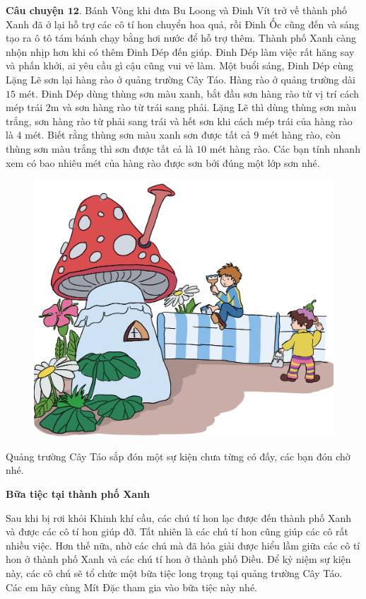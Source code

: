 	\textbf{\color{toancuabi}Câu chuyện $\pmb{12.}$} Bánh Vòng khi đưa Bu Loong và Đinh Vít trở về thành phố Xanh đã ở lại hỗ trợ các cô tí hon chuyển hoa quả, rồi Đinh Ốc cũng đến và sáng tạo ra ô tô tám bánh chạy bằng hơi nước để hỗ trợ thêm. Thành phố Xanh càng nhộn nhịp hơn khi có thêm Đinh Dép đến giúp. Đinh Dép làm việc rất hăng say và phấn khởi, ai yêu cầu gì cậu cũng vui vẻ làm. Một buổi sáng, Đinh Dép cùng Lặng Lẽ sơn lại hàng rào ở quảng trường Cây Táo. Hàng rào ở quảng trường dài $15$ mét. Đinh Dép dùng thùng sơn màu xanh, bắt đầu sơn hàng rào từ vị trí cách mép trái $2$m và sơn hàng rào từ trái sang phải. Lặng Lẽ thì dùng thùng sơn màu trắng, sơn hàng rào từ phải sang trái và hết sơn khi cách mép trái của hàng rào là $4$ mét. Biết rằng thùng sơn màu xanh sơn được tất cả $9$ mét hàng rào, còn thùng sơn màu trắng thì sơn được tất cả là $10$ mét hàng rào. Các bạn tính nhanh xem có bao nhiêu mét của hàng rào được sơn bởi đúng một lớp sơn nhé.
	\begin{figure}[H]
		\centering
		\vspace*{-5pt}
		\captionsetup{labelformat= empty, justification=centering}
		\includegraphics[width=0.55\linewidth]{Hinh14_SonRao}
		\vspace*{-10pt}
	\end{figure}
	Quảng trường Cây Táo sắp đón một sự kiện chưa từng có đấy, các bạn đón chờ nhé.
	\vskip 0.1cm
	\centerline{\textbf{\color{toancuabi}Bữa tiệc tại thành phố Xanh}}
	\vskip 0.1cm
	Sau khi bị rơi khỏi Khinh khí cầu, các chú tí hon lạc được đến thành phố Xanh và được các cô tí hon giúp đỡ. Tất nhiên là các chú tí hon cũng giúp các cô rất nhiều việc. Hơn thế nữa, nhờ các chú mà đã hóa giải được hiểu lầm giữa các cô tí hon ở thành phố Xanh và các chú tí hon ở thành phố Diều.  Để kỷ niệm sự kiện này, các cô chú sẽ tổ chức một bữa tiệc long trọng tại quảng trường Cây Táo.
	Các em hãy cùng Mít Đặc tham gia vào bữa tiệc này nhé.
